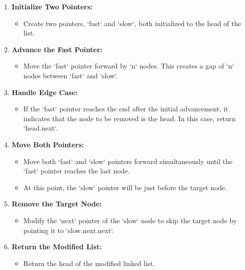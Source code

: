 \begin{enumerate}
    \item \textbf{Initialize Two Pointers:}
    \begin{itemize}
        \item Create two pointers, `fast` and `slow`, both initialized to the head of the list.
    \end{itemize}
    
    \item \textbf{Advance the Fast Pointer:}
    \begin{itemize}
        \item Move the `fast` pointer forward by `n` nodes. This creates a gap of `n` nodes between `fast` and `slow`.
    \end{itemize}
    
    \item \textbf{Handle Edge Case:}
    \begin{itemize}
        \item If the `fast` pointer reaches the end after the initial advancement, it indicates that the node to be removed is the head. In this case, return `head.next`.
    \end{itemize}
    
    \item \textbf{Move Both Pointers:}
    \begin{itemize}
        \item Move both `fast` and `slow` pointers forward simultaneously until the `fast` pointer reaches the last node.
        \item At this point, the `slow` pointer will be just before the target node.
    \end{itemize}
    
    \item \textbf{Remove the Target Node:}
    \begin{itemize}
        \item Modify the `next` pointer of the `slow` node to skip the target node by pointing it to `slow.next.next`.
    \end{itemize}
    
    \item \textbf{Return the Modified List:}
    \begin{itemize}
        \item Return the head of the modified linked list.
    \end{itemize}
\end{enumerate}

